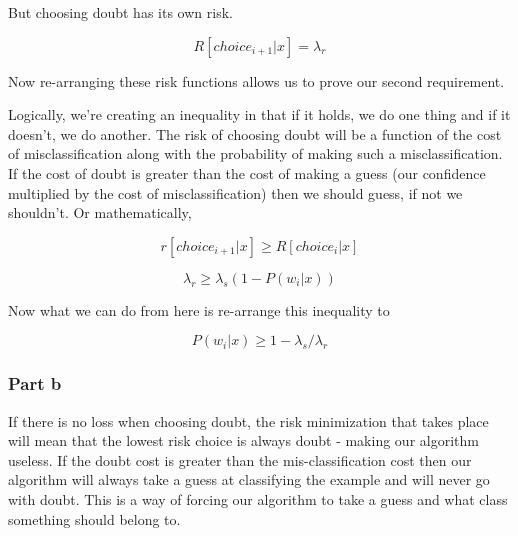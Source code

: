 \documentclass[11pt]{article}
\begin{document}
But choosing doubt has its own risk.

$$ R[choice_{i+1} |x] =  \lambda_r $$

Now re-arranging these risk functions allows us to prove our second requirement.

Logically, we're creating an inequality in that if it holds, we do one thing and if it doesn't, we do another. The risk of choosing doubt will be a function of the cost of misclassification along with the probability of making such a misclassification. If the cost of doubt is greater than the cost of making a guess (our confidence multiplied by the cost of misclassification) then we should guess, if not we shouldn't. Or mathematically,

$$ r[choice_{i+1} | x] \geq R[choice_i |x] $$

$$ \lambda_r \geq \lambda_s (1-P(w_i |x)) $$

Now what we can do from here is re-arrange this inequality to

$$ P(w_i |x) \geq 1 - \lambda_s / \lambda_r $$

\subsubsection{Part b}
\label{sec-8-1-2}
If there is no loss when choosing doubt, the risk minimization that takes place will mean that the lowest risk choice is always doubt - making our algorithm useless. If the doubt cost is greater than the mis-classification cost then our algorithm will always take a guess at classifying the example and will never go with doubt. This is a way of forcing our algorithm to take a guess and what class something should belong to.
\newpage
\end{document}
